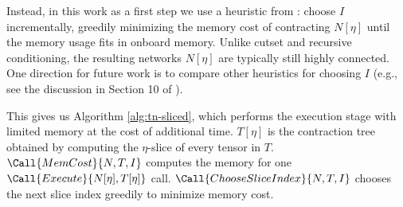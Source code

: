 Instead, in this work as a first step we use a heuristic from \cite{CZHNS18,GK20}: choose $I$ incrementally, greedily minimizing the memory cost of contracting $N[\eta]$ until the memory usage fits in onboard memory. Unlike cutset and recursive conditioning, the resulting networks $N[\eta]$ are typically still highly connected. One direction for future work is to compare other heuristics for choosing $I$ (e.g., see the discussion in Section 10 of \cite{dechter99}).

This gives us Algorithm \ref{alg:tn-sliced}, which performs the execution stage with limited memory at the cost of additional time. $T[\eta]$ is the contraction tree obtained by computing the $\eta$-slice of every tensor in $T$. $\Call{MemCost}{N, T, I}$ computes the memory for one $\Call{Execute}{N[\eta], T[\eta]}$ call. $\Call{ChooseSliceIndex}{N,T,I}$ chooses the next slice index greedily to minimize memory cost.

